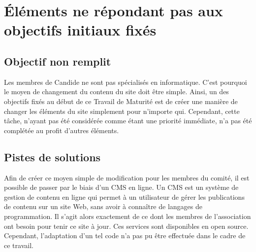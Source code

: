 \documentclass[a4,10pt,french]{sphinxmanual}
\begin{document}
\section{Éléments ne répondant pas aux objectifs initiaux fixés}
\label{\detokenize{chapitre-03:elements-ne-repondant-pas-aux-objectifs-initiaux-fixes}}

\subsection{Objectif non remplit}
\label{\detokenize{chapitre-03:objectif-non-remplit}}
\sphinxAtStartPar
Les membres de Candide ne sont pas spécialisés en informatique. C’est pourquoi le moyen de changement du contenu du site doit être simple. Ainsi, un des objectifs fixés au début de ce Travail de Maturité est de créer une manière de changer les éléments du site simplement pour n’importe qui. Cependant, cette tâche, n’ayant pas été considérée comme étant une priorité immédiate, n’a pas été complétée au profit d’autres éléments.


\subsection{Pistes de solutions}
\label{\detokenize{chapitre-03:pistes-de-solutions}}
\sphinxAtStartPar
Afin de créer ce moyen simple de modification pour les membres du comité, il est possible de passer par le biais d’un CMS en ligne. Un CMS est un système de gestion de contenu en ligne qui permet à un utilisateur de gérer les publications de contenu sur un site Web, sans avoir à connaître de langages de programmation. Il s’agit alors exactement de ce dont les membres de l’association ont besoin pour tenir ce site à jour. Ces services sont disponibles en open source. Cependant, l’adaptation d’un tel code n’a pas pu être effectuée dans le cadre de ce travail.
\end{document}

